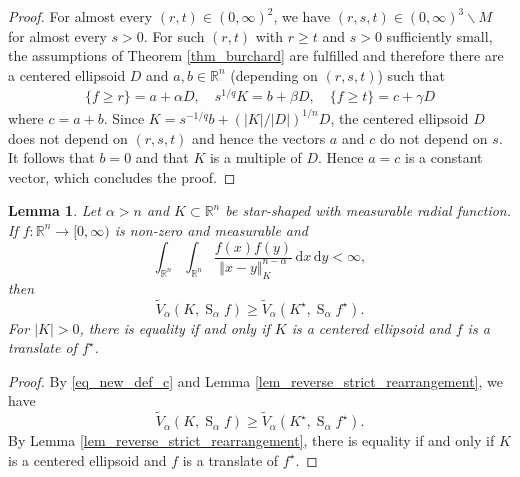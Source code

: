 \documentclass{amsart}
\newtheorem{lemma}[theorem]{Lemma}
\newcommand{\R}{\mathbb R}
\renewcommand{\d}{\,\mathrm{d}}
\newcommand{\vol}[1]{\vert #1\vert}
\newcommand{\hls}[1]{\operatorname{S}_{#1}\!} %
\begin{document}
\begin{proof}
\goodbreak    
    For almost every $( r,  t)\in(0,\infty)^2$, we have $(r,s, t)\in (0,\infty)^3\backslash M$ for almost every $s>0$.
    For  such $( r,  t)$ with $ r\ge  t$ and $s>0$ sufficiently small, the assumptions of Theorem \ref{thm_burchard} are fulfilled and therefore there are a centered ellipsoid $D$ and $a, b\in\R^n$ (depending on $( r, s, t)$)  such that
    \begin{align}
     \{f \ge  r\}= a + \alpha D,\quad s^{1/q} K=  b + \beta D,\quad \{f \ge  t\}= c + \gamma D
    \end{align}
    where $c= a+ b$. 
    Since $ K=  s^{-1/q}b + (\vol{K}/\vol{D})^{1/n} D$, the centered ellipsoid $D$ does not depend on $(r,s,t)$ and hence the vectors $a$ and $c$ do not depend on $s$. It follows that $b=0$ and  that $K$ is a multiple of $D$. Hence $a=c$ is a constant vector, which concludes the proof.
 \end{proof}

\goodbreak
\begin{lemma}\label{lem_reverse_support_Riesz}
Let  $\alpha>n$ and $K\subset\R^n$ be star-shaped with measurable radial function. If  $
f:\R^n\to[0,\infty)$ is non-zero and measurable
 and
\begin{equation}
\int_{\R^n}\int_{\R^n} \frac{f(x) f(y)}{\Vert x-y\Vert_K^{n-\alpha}} \d x \d y<\infty,
\end{equation}
then
\begin{equation}
\tilde V_\alpha(K, \hls\alpha f) \geq \tilde V_\alpha(K^\star, \hls\alpha f^\star).
\end{equation}
For $\vol{K}>0$, there is equality if and only if $K$ is a centered ellipsoid and $f$ is a translate of $f^\star$.
\end{lemma}

\goodbreak
\begin{proof}
By \eqref{eq_new_def_c} and Lemma \ref{lem_reverse_strict_rearrangement}, we have
\[\tilde V_\alpha(K, \hls\alpha f) \geq \tilde V_\alpha(K^\star, \hls\alpha f^\star).\]
By Lemma \ref{lem_reverse_strict_rearrangement}, there is equality if and only if $K$ is a centered ellipsoid and $f$ is a translate of $f^\star$.
\end{proof}
\end{document}
